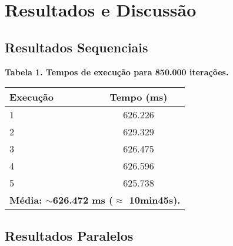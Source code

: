 \documentclass[12pt]{article}
\begin{document}
\section{Resultados e Discussão}
\subsection{Resultados Sequenciais}

\begin{center}
    \textbf{Tabela 1. Tempos de execução para 850.000 iterações.} \\ %
    \begin{tabular}{lcc}
        \toprule
        \textbf{Execução} & & \textbf{Tempo (ms)} \\
        \midrule
        1 & & 626.226 \\
        2 & & 629.329 \\
        3 & & 626.475 \\
        4 & & 626.596 \\
        5 & & 625.738 \\
        \midrule
        \multicolumn{3}{l}{\textbf{Média: $\sim$626.472 ms ($\approx$ 10min45s).}} \\
        \bottomrule
    \end{tabular}
\end{center}

\subsection{Resultados Paralelos}
\end{document}
